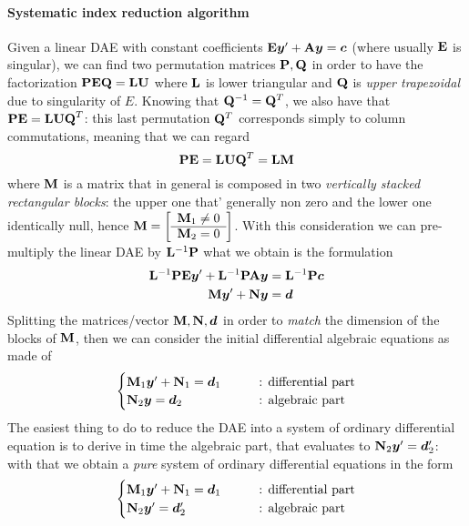 	\paragraph{Systematic index reduction algorithm} Given a linear DAE with constant coefficients $\mathbf{E} \boldsymbol{y}' + \mathbf{A} \boldsymbol{y} = \boldsymbol{c}$ (where usually $\mathbf{E}$ is singular), we can find two permutation matrices $\mathbf{P}, \mathbf{Q}$ in order to have the factorization $\mathbf{PEQ} = \mathbf{LU}$ where $\mathbf{L}$ is lower triangular and $\mathbf{Q}$ is \textit{upper trapezoidal} due to singularity of $E$. Knowing that $\mathbf{Q}^{-1} = \mathbf{Q}^T$, we also have that $\mathbf{PE} = \mathbf{LUQ}^T$: this last permutation $\mathbf{Q}^T$ corresponds simply to column commutations, meaning that we can regard
	\[ \mathbf{PE} = \mathbf{LUQ}^T = \mathbf{LM} \]
	where $\mathbf{M}$ is a matrix that in general is composed in two \textit{vertically stacked rectangular blocks}: the upper one that' generally non zero and the lower one identically null, hence $\mathbf{M} = \begin{bmatrix} \begin{array}{c}
			\mathbf{M}_1 \neq 0 \\ \hline \mathbf{M}_2 =  0
	\end{array} \end{bmatrix}$. With this consideration we can pre-multiply the linear DAE by $\mathbf{L}^{-1} \mathbf{P}$ what we obtain is the formulation
	\begin{equation}
	\begin{split}
		\mathbf{L}^{-1} \mathbf{PE} \boldsymbol{y}' + \mathbf{L}^{-1} \mathbf{PA} \boldsymbol{y} & = \mathbf{L}^{-1} \mathbf{P} \boldsymbol{c} \\
		\mathbf{M} \boldsymbol{y}' + \mathbf{N} \boldsymbol{y} & = \boldsymbol{d}
 	\end{split}
	\end{equation}
	Splitting the matrices/vector $\mathbf{M},\mathbf{N}, \boldsymbol{d}$ in order to \textit{match} the dimension of the blocks of $\mathbf{M}$, then we can consider the initial differential algebraic equations as made of
	\[ \begin{cases}
		\mathbf{M}_1 \boldsymbol{y}' + \mathbf{N}_1 = \boldsymbol{d}_1 \qquad & \textrm{: differential part} \\
		\mathbf{N}_2 \boldsymbol{y} = \boldsymbol{d}_2 & \textrm{: algebraic part}
	\end{cases} \]
	The easiest thing to do to reduce the DAE into a system of ordinary differential equation is to derive in time the algebraic part, that evaluates to $\mathbf{N}_2 \boldsymbol{y}' = \boldsymbol{d}_2'$: with that we obtain a \textit{pure} system of ordinary differential equations in the form
	\[ \begin{cases}
		\mathbf{M}_1 \boldsymbol{y}' + \mathbf{N}_1 = \boldsymbol{d}_1 \qquad & \textrm{: differential part} \\
		\mathbf{N}_2 \boldsymbol{y}' = \boldsymbol{d}_2' & \textrm{: algebraic part}
	\end{cases} \]
